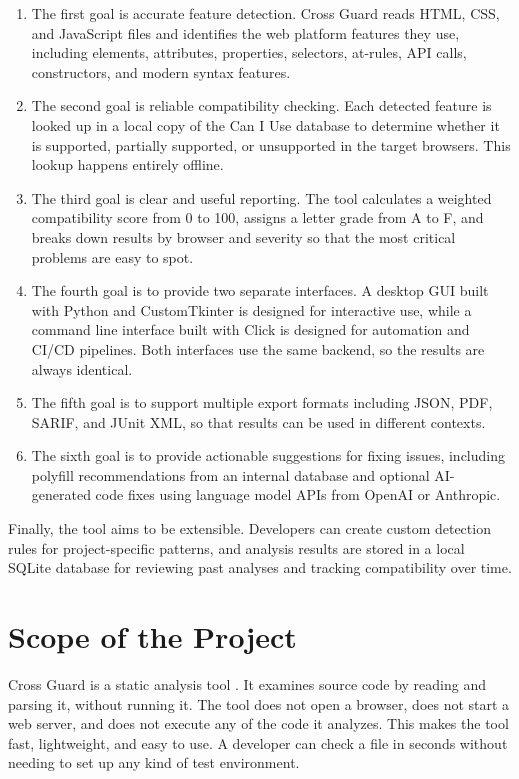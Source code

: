 \begin{enumerate}
    \item The first goal is accurate feature detection. Cross Guard reads HTML, CSS, and JavaScript files and identifies the web platform features they use, including elements, attributes, properties, selectors, at-rules, API calls, constructors, and modern syntax features.
    \item The second goal is reliable compatibility checking. Each detected feature is looked up in a local copy of the Can I Use database to determine whether it is supported, partially supported, or unsupported in the target browsers. This lookup happens entirely offline.
    \item The third goal is clear and useful reporting. The tool calculates a weighted compatibility score from 0 to 100, assigns a letter grade from A to F, and breaks down results by browser and severity so that the most critical problems are easy to spot.
    \item The fourth goal is to provide two separate interfaces. A desktop GUI built with Python and CustomTkinter is designed for interactive use, while a command line interface built with Click is designed for automation and CI/CD pipelines. Both interfaces use the same backend, so the results are always identical.
    \item The fifth goal is to support multiple export formats including JSON, PDF, SARIF, and JUnit XML, so that results can be used in different contexts. 
    \item The sixth goal is to provide actionable suggestions for fixing issues, including polyfill recommendations from an internal database and optional AI-generated code fixes using language model APIs from OpenAI or Anthropic.
\end{enumerate}

Finally, the tool aims to be extensible. Developers can create custom detection rules for project-specific patterns, and analysis results are stored in a local SQLite database for reviewing past analyses and tracking compatibility over time.

\section{Scope of the Project}
\label{sec:scope}

Cross Guard is a static analysis tool \cite{binkley2007sca}. It examines source code by reading and parsing it, without running it. The tool does not open a browser, does not start a web server, and does not execute any of the code it analyzes. This makes the tool fast, lightweight, and easy to use. A developer can check a file in seconds without needing to set up any kind of test environment.

